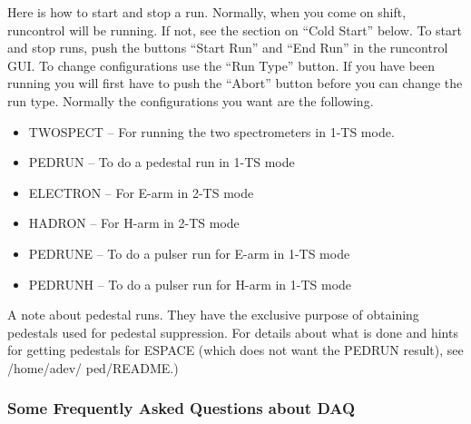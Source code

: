 \par
Here is how to start and stop a run.
Normally, when you come on shift, 
runcontrol will be running.  If not,
see the section on ``Cold Start'' below.
To start and stop runs, push the buttons
``Start Run'' and ``End Run'' in the
runcontrol GUI.   To change configurations
use the ``Run Type'' button.  If you have
been running you will first have to push the
``Abort'' button before you can change the 
run type.  Normally the configurations
you want are the following.

\begin{itemize} 
\item[~]TWOSPECT -- For running the two spectrometers in
1-TS mode.
\item[~]PEDRUN -- To do a pedestal run in 1-TS mode
\item[~]ELECTRON -- For E-arm in 2-TS mode
\item[~]HADRON -- For H-arm in 2-TS mode
\item[~]PEDRUNE -- To do a pulser run for E-arm in 1-TS mode
\item[~]PEDRUNH -- To do a pulser run for H-arm in 1-TS mode
\end{itemize} 

\par 
A note about pedestal runs.  They have the exclusive
purpose of obtaining pedestals used for pedestal
suppression.  For details about what is done
and hints for getting pedestals for ESPACE (which
does not want the PEDRUN result), see /home/adev/
ped/README.)

\subsubsection{
 Some Frequently Asked Questions about DAQ}


